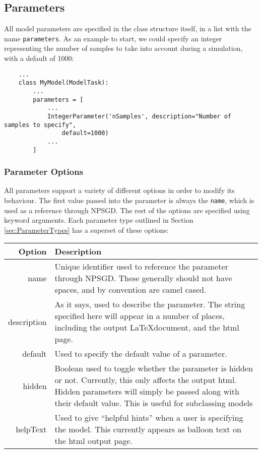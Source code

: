 \documentclass{article}
\newcommand{\mpath}[1]{\texttt{#1}}
\begin{document}
\subsection{Parameters}
All model parameters are specified in
the class structure itself, in a list with the name \mpath{parameters}. As an
example to start, we could specify an integer representing the number of samples
to take into account during a simulation, with a default of 1000:
\begin{lstlisting}
    ...
    class MyModel(ModelTask):
        ...
        parameters = [
            ...
            IntegerParameter('nSamples', description="Number of samples to specify",
                default=1000)
            ...
        ]

\end{lstlisting}

\subsubsection{Parameter Options}
All parameters support a variety of different options in order to modify its
behaviour. The first value passed into the parameter is always the
\texttt{name}, which is used as a reference through NPSGD. The rest of the
options are specified using keyword arguments. Each parameter type outlined in
Section \ref{sec:ParameterTypes} has a superset of these options:\\
\begin{tabular}{ r p{4in} }
    \textbf{Option} & \textbf{Description} \\
    \hline
    name & Unique identifier used to reference the parameter through NPSGD.
           These generally should not have spaces, and by convention are camel
           cased. \\
    description & As it says, used to describe the parameter. The string
                  specified here will appear in a number of places, including
                  the output \LaTeX document, and the html page. \\
    default & Used to specify the default value of a parameter. \\
    hidden  & Boolean used to toggle whether the parameter is hidden or not.
              Currently, this only affects the output html. Hidden parameters will simply
              be passed along with their default value. This is useful for
              subclassing models\\
    helpText & Used to give ``helpful hints'' when a user is specifying the
               model. This currently appears as balloon text on the html output
               page.
\end{tabular}
\end{document}
